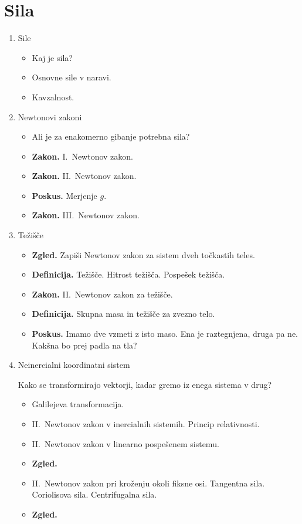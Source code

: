 \section{Sila}
\begin{enumerate}
    \item Sile
    \begin{itemize}
        \item Kaj je sila? 
        \item Osnovne sile v naravi.
        \item Kavzalnost.
    \end{itemize}

    \item Newtonovi zakoni
    \begin{itemize}
        \item Ali je za enakomerno gibanje potrebna sila?
        \item \textbf{Zakon.} I.\ Newtonov zakon.
        \item \textbf{Zakon.} II.\ Newtonov zakon.
        \item \textbf{Poskus.} Merjenje \(g\).
        \item \textbf{Zakon.} III.\ Newtonov zakon.
    \end{itemize}

    \item Težišče
    \begin{itemize}
        \item \textbf{Zgled.} Zapiši Newtonov zakon za sistem dveh točkastih teles.
        \item \textbf{Definicija.} Težišče. Hitrost težišča. Pospešek težišča.
        \item \textbf{Zakon.} II.\ Newtonov zakon za težišče.
        \item \textbf{Definicija.} Skupna masa in težišče za zvezno telo.
        \item \textbf{Poskus.} Imamo dve vzmeti z isto maso. Ena je raztegnjena, druga pa ne. Kakšna bo prej padla na tla?
    \end{itemize}

    \item Neinercialni koordinatni sistem
    
    Kako se transformirajo vektorji, kadar gremo iz enega sistema v drug?
    \begin{itemize}
        \item Galilejeva transformacija.
        \item II.\ Newtonov zakon v inercialnih sistemih. Princip relativnosti.
        \item II.\ Newtonov zakon v linearno pospešenem sistemu.
        \item \textbf{Zgled.} \todo{}
        \item II.\ Newtonov zakon pri kroženju okoli fiksne osi. Tangentna sila. Coriolisova sila. Centrifugalna sila.
        \item \textbf{Zgled.} \todo{}
    \end{itemize}
\end{enumerate}